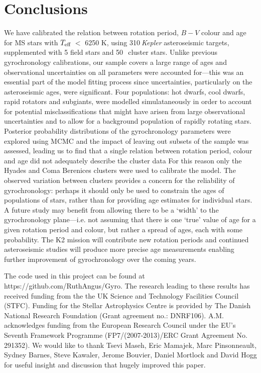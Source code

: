 \documentclass[11pt,preprint]{aastex}
\newcommand{\teff}{$T_{\rm{eff}}$}
\newcommand{\nastero}{310}
\newcommand{\nHC}{50~}
\begin{document}
\section{Conclusions}
\label{sec:conclusions}

We have calibrated the relation between rotation period, $B-V$ colour and age for MS stars with \teff$~<$ 6250 K, using \nastero$~${\it Kepler} asteroseismic targets, supplemented with 5 field stars and \nHC$~$cluster stars.
Unlike previous gyrochronology calibrations, our sample covers a large range of ages and observational uncertainties on all parameters were accounted for---this was an essential part of the model fitting process since uncertainties, particularly on the asteroseismic ages, were significant.
Four populations: hot dwarfs, cool dwarfs, rapid rotators and subgiants, were modelled simulataneously in order to account for potential misclassifications that might have arisen from large observational uncertainties and to allow for a background population of rapidly rotating stars.
Posterior probability distributions of the gyrochronology parameters were explored using MCMC and the impact of leaving out subsets of the sample was assessed, leading us to find that a single relation between rotation period, colour and age did not adequately describe the cluster data
For this reason only the Hyades and Coma Berenices clusters were used to calibrate the model.
The observed variation between clusters provides a concern for the reliability of gyrochronology: perhaps it should only be used to constrain the ages of populations of stars, rather than for providing age estimates for individual stars.
A future study may benefit from allowing there to be a `width' to the gyrochronology plane---i.e. not assuming that there is one `true' value of age for a given rotation period and colour, but rather a spread of ages, each with some probability.
The K2 mission will contribute new rotation periods and continued asteroseismic studies will produce more precise age measurements enabling further improvement of gyrochronology over the coming years.

The code used in this project can be found at https://github.com/RuthAngus/Gyro.
The research leading to these results has received funding from the the UK Science and Technology Facilities Council (STFC).
Funding for the Stellar Astrophysics Centre is provided by The Danish National Research Foundation (Grant agreement no.: DNRF106).
A.M. acknowledges funding from the European Research Council under the EU’s Seventh Framework Programme (FP7/(2007-2013)/ERC Grant Agreement No. 291352).
We would like to thank Tsevi Maseh, Eric Mamajek, Marc Pinsonneault, Sydney Barnes, Steve Kawaler, Jerome Bouvier, Daniel Mortlock and David Hogg for useful insight and discussion that hugely improved this paper.
\end{document}
